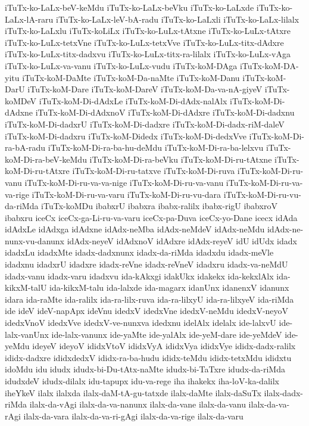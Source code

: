 {iTuTx-ko-LaLx-beV-keMdu
iTuTx-ko-LaLx-beVku
iTuTx-ko-LaLxde
iTuTx-ko-LaLx-lA-raru
iTuTx-ko-LaLx-leV-bA-radu
iTuTx-ko-LaLxli
iTuTx-ko-LaLx-lilalx
iTuTx-ko-LaLxlu
iTuTx-koLiLx
iTuTx-ko-LuLx-tAtxne
iTuTx-ko-LuLx-tAtxre
iTuTx-ko-LuLx-tetxVne
iTuTx-ko-LuLx-tetxVve
iTuTx-ko-LuLx-titx-dAdxre
iTuTx-ko-LuLx-titx-dadxvu
iTuTx-ko-LuLx-titx-ra-lilalx
iTuTx-ko-LuLx-vAga
iTuTx-ko-LuLx-va-vanu
iTuTx-ko-LuLx-vudu
iTuTx-koM-DAga
iTuTx-koM-DA-yitu
iTuTx-koM-DaMte
iTuTx-koM-Da-naMte
iTuTx-koM-Danu
iTuTx-koM-DarU
iTuTx-koM-Dare
iTuTx-koM-DareV
iTuTx-koM-Da-va-nA-giyeV
iTuTx-koMDeV
iTuTx-koM-Di-dAdxLe
iTuTx-koM-Di-dAdx-nalAlx
iTuTx-koM-Di-dAdxne
iTuTx-koM-Di-dAdxnoV
iTuTx-koM-Di-dAdxre
iTuTx-koM-Di-dadxnu
iTuTx-koM-Di-dadxrU
iTuTx-koM-Di-dadxre
iTuTx-koM-Di-dadx-riM-daleV
iTuTx-koM-Di-dadxru
iTuTx-koM-Didedx
iTuTx-koM-Di-dedxVve
iTuTx-koM-Di-ra-bA-radu
iTuTx-koM-Di-ra-ba-hu-deMdu
iTuTx-koM-Di-ra-ba-lelxvu
iTuTx-koM-Di-ra-beV-keMdu
iTuTx-koM-Di-ra-beVku
iTuTx-koM-Di-ru-tAtxne
iTuTx-koM-Di-ru-tAtxre
iTuTx-koM-Di-ru-tatxve
iTuTx-koM-Di-ruva
iTuTx-koM-Di-ru-vanu
iTuTx-koM-Di-ru-va-va-nige
iTuTx-koM-Di-ru-va-vanu
iTuTx-koM-Di-ru-va-va-rige
iTuTx-koM-Di-ru-va-varu
iTuTx-koM-Di-ru-vu-dara
iTuTx-koM-Di-ru-vu-da-riMda
iTuTx-koMDu
ibabxrU
ibabxra
ibabx-ralilx
ibabx-rigU
ibabxroV
ibabxru
iceCx
iceCx-ga-Li-ru-va-varu
iceCx-pa-Duva
iceCx-yo-Dane
icecx
idAda
idAdxLe
idAdxga
idAdxne
idAdx-neMba
idAdx-neMdeV
idAdx-neMdu
idAdx-ne-nunx-vu-danunx
idAdx-neyeV
idAdxnoV
idAdxre
idAdx-reyeV
idU
idUdx
idadx
idadxLu
idadxMte
idadx-dadxnunx
idadx-da-riMda
idadxdu
idadx-meVle
idadxnu
idadxrU
idadxre
idadx-reVne
idadx-reVneV
idadxru
idadx-va-neMdU
idadx-vanu
idadx-varu
idadxvu
ida-kAkxgi
idakUkx
idakekx
ida-kekxlAlx
ida-kikxM-talU
ida-kikxM-talu
ida-lalxde
ida-magarx
idanUnx
idanenxV
idanunx
idara
ida-raMte
ida-ralilx
ida-ra-lilx-ruva
ida-ra-lilxyU
ida-ra-lilxyeV
ida-riMda
ide
ideV
ideV-napApx
ideVnu
idedxV
idedxVne
idedxV-neMdu
idedxV-neyoV
idedxVnoV
idedxVve
idedxV-ve-nunxva
idedxnu
idelAlx
idelalx
ide-lalxvU
ide-lalx-vanUnx
ide-lalx-vanunx
ide-yaMte
ide-yalAlx
ide-yeM-dare
ide-yeMdeV
ide-yeMdu
ideyeV
ideyoV
ididxVtoV
ididxVyA
ididxVya
ididxVye
ididx-dadx-ralilx
ididx-dadxre
ididxdedxV
ididx-ra-ba-hudu
ididx-teMdu
ididx-tetxMdu
ididxtu
idoMdu
idu
idudx
idudx-bi-Du-tAtx-naMte
idudx-bi-TaTxre
idudx-da-riMda
idudxdeV
idudx-dilalx
idu-tapupx
idu-va-rege
iha
ihakekx
iha-loV-ka-dalilx
iheYkeV
ilalx
ilalxda
ilalx-daM-tA-gu-tatxde
ilalx-daMte
ilalx-daSuTx
ilalx-dadx-riMda
ilalx-da-vAgi
ilalx-da-va-nanunx
ilalx-da-vane
ilalx-da-vanu
ilalx-da-va-rAgi
ilalx-da-vara
ilalx-da-va-ri-gAgi
ilalx-da-va-rige
ilalx-da-varu
}
